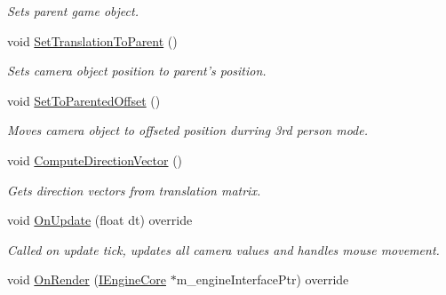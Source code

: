 \begin{DoxyCompactItemize}
\begin{DoxyCompactList}\small\item\em Sets parent game object. \end{DoxyCompactList}\item 
\hypertarget{class_camera_component_aa0d12f5b387e651246a0679669501440}{void \hyperlink{class_camera_component_aa0d12f5b387e651246a0679669501440}{Set\+Translation\+To\+Parent} ()}\label{class_camera_component_aa0d12f5b387e651246a0679669501440}

\begin{DoxyCompactList}\small\item\em Sets camera object position to parent's position. \end{DoxyCompactList}\item 
\hypertarget{class_camera_component_a0fea5ba248b0d18b9c412429092504b6}{void \hyperlink{class_camera_component_a0fea5ba248b0d18b9c412429092504b6}{Set\+To\+Parented\+Offset} ()}\label{class_camera_component_a0fea5ba248b0d18b9c412429092504b6}

\begin{DoxyCompactList}\small\item\em Moves camera object to offseted position durring 3rd person mode. \end{DoxyCompactList}\item 
\hypertarget{class_camera_component_a09c8c13788174831d14f6b600da0aa73}{void \hyperlink{class_camera_component_a09c8c13788174831d14f6b600da0aa73}{Compute\+Direction\+Vector} ()}\label{class_camera_component_a09c8c13788174831d14f6b600da0aa73}

\begin{DoxyCompactList}\small\item\em Gets direction vectors from translation matrix. \end{DoxyCompactList}\item 
\hypertarget{class_camera_component_aa0391037fd478ea1a602835ea64091ba}{void \hyperlink{class_camera_component_aa0391037fd478ea1a602835ea64091ba}{On\+Update} (float dt) override}\label{class_camera_component_aa0391037fd478ea1a602835ea64091ba}

\begin{DoxyCompactList}\small\item\em Called on update tick, updates all camera values and handles mouse movement. \end{DoxyCompactList}\item 
\hypertarget{class_camera_component_a4ef61a586b2c0a3e975150263d31d68b}{void \hyperlink{class_camera_component_a4ef61a586b2c0a3e975150263d31d68b}{On\+Render} (\hyperlink{class_i_engine_core}{I\+Engine\+Core} $\ast$m\+\_\+engine\+Interface\+Ptr) override}\label{class_camera_component_a4ef61a586b2c0a3e975150263d31d68b}


\end{DoxyCompactItemize}
